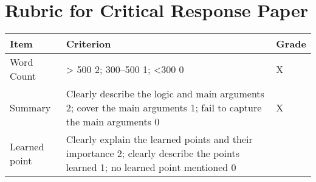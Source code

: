 \documentclass[11pt,]{article}
\theoremstyle{definition}
\theoremstyle{definition}
\theoremstyle{definition}
\theoremstyle{remark}
\begin{document}
\hypertarget{id}{\section{Rubric for Critical Response Paper}\label{id}}

\begin{longtable}[]{@{}lll@{}}
\toprule
\begin{minipage}[b]{0.15\columnwidth}\raggedright\strut
Item\strut
\end{minipage} & \begin{minipage}[b]{0.72\columnwidth}\raggedright\strut
Criterion\strut
\end{minipage} & \begin{minipage}[b]{0.05\columnwidth}\raggedright\strut
Grade\strut
\end{minipage}\tabularnewline
\midrule
\endhead
\begin{minipage}[t]{0.15\columnwidth}\raggedright\strut
Word Count\strut
\end{minipage} & \begin{minipage}[t]{0.72\columnwidth}\raggedright\strut
\textgreater{} 500 2; 300--500 1; \textless{}300 0\strut
\end{minipage} & \begin{minipage}[t]{0.05\columnwidth}\raggedright\strut
X\strut
\end{minipage}\tabularnewline
\begin{minipage}[t]{0.15\columnwidth}\raggedright\strut
Summary\strut
\end{minipage} & \begin{minipage}[t]{0.72\columnwidth}\raggedright\strut
Clearly describe the logic and main arguments 2; cover the main
arguments 1; fail to capture the main arguments 0\strut
\end{minipage} & \begin{minipage}[t]{0.05\columnwidth}\raggedright\strut
X\strut
\end{minipage}\tabularnewline
\begin{minipage}[t]{0.15\columnwidth}\raggedright\strut
Learned point\strut
\end{minipage} & \begin{minipage}[t]{0.72\columnwidth}\raggedright\strut
Clearly explain the learned points and their importance 2; clearly
describe the points learned 1; no learned point mentioned 0\strut
\end{minipage} & \begin{minipage}[t]{0.05\columnwidth}\raggedright\strut

\end{minipage}
\end{longtable}
\end{document}
